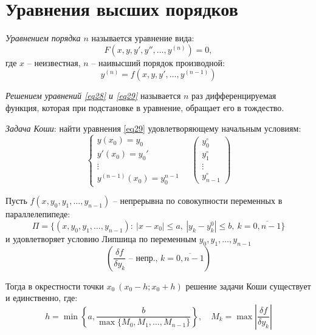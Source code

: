 \section{Уравнения высших порядков}

\begin{definition}
    \emph{Уравнением порядка $n$} называется уравнение вида:
    \begin{equation}\label{eq28}
        F(x,y,y',y'',\ldots,y^{(n)}) = 0,
    \end{equation}
    где $x$ -- неизвестная, $n$ -- наивысший порядок производной:
    \begin{equation}\label{eq29}
        y^{(n)} = f(x,y,y',\ldots,y^{(n-1)})
    \end{equation}
\end{definition}

\begin{definition}
    \emph{Решением уравнений \ref{eq28} и \ref{eq29}} называется $n$ раз дифференцируемая функция, которая при подстановке в уравнение, обращает его в тождество.
\end{definition}

\begin{definition}
    \emph{Задача Коши}: найти уравнения \ref{eq29} удовлетворяющему начальным условиям:
    \begin{equation}\label{eq30}
        \left\{\begin{array}{l}
            y(x_0) = y_0   \\
            y'(x_0) = y_0' \\
            \vdots         \\
            y^{(n-1)}(x_0) = y_0^{n-1}
        \end{array}\right. \quad \left(\begin{matrix}
                y_0^\circ \\ y_1^\circ \\ \vdots \\ y_{n-1}^\circ
            \end{matrix}\right)
    \end{equation}
\end{definition}

\begin{theorem}
    Пусть $f(x,y_0,y_1,\ldots,y_{n-1})$ -- непрерывна по совокупности переменных в параллелепипеде:
    \[
        \Pi = \big\{(x,y_0,y_1,\ldots,y_{n-1}): \ |x-x_0|\leqslant a, \ |y_k - y_k^0| \leqslant b, \ k = \overline{0,n-1}\big\}
    \]
    и удовлетворяет условию Липшица по переменным $y_0,y_1,\ldots,y_{n-1}$
    \[
        \left(\frac{\delta f}{\delta y_k}\text{ -- непр., }k = \overline{0,n-1}\right)
    \]

    Тогда в окрестности точки $x_0 \ (x_0 - h;x_0 + h)$ решение задачи Коши существует и единственно,  где:
    \[
        h = \min\left\{a,\frac{b}{\max\{M_0,M_1,\ldots,M_{n-1}\}}\right\}, \quad M_k = \max\left|\frac{\delta f}{\delta y_k}\right|
    \]
\end{theorem}

